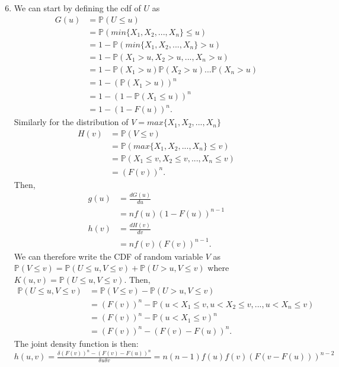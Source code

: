\documentclass{article}
\begin{document}
\begin{enumerate}
    \setcounter{enumi}{5}
    \item 
    
    We can start by defining the cdf of $U$ as
    \begin{align*}
        G(u)&=\mathbb{P}(U\leq u)\\
        &= \mathbb{P}(min\{X_1, X_2, ..., X_n\}\leq u)\\
        &= 1-\mathbb{P}(min\{X_1, X_2, ..., X_n\}> u)\\
        &= 1-\mathbb{P}(X_1>u, X_2>u, ..., X_n>u)\\
        &= 1-\mathbb{P}(X_1>u)\mathbb{P}(X_2>u)...\mathbb{P}(X_n>u)\\
        &=1-(\mathbb{P}(X_1>u))^n\\
        &=1-(1-\mathbb{P}(X_1\leq u))^n\\
        &= 1-(1-F(u))^n.
    \end{align*} Similarly for the distribution of $V=max\{X_1, X_2, ..., X_n\}$
    \begin{align*}
        H(v)&=\mathbb{P}(V\leq v)\\
        &= \mathbb{P}(max\{X_1, X_2, ..., X_n\}\leq v)\\
        &= \mathbb{P}(X_1\leq v, X_2\leq v, ..., X_n\leq v)\\
        &= (F(v))^n.
    \end{align*} Then, 
    \begin{align*}
        g(u)&=\frac{dG(u)}{du}\\
        &=nf(u)(1-F(u))^{n-1}\\
        h(v)&=\frac{dH(v)}{dv}\\
        &= nf(v)(F(v))^{n-1}.
    \end{align*} We can therefore write the CDF of random variable $V$ as $\mathbb{P}(V\leq v)=\mathbb{P}(U\leq u, V\leq v)+\mathbb{P}(U>u, V\leq v)$ where $K(u, v)=\mathbb{P}(U\leq u, V\leq v)$. Then,
    \begin{align*}
        \mathbb{P}(U\leq u, V\leq v) &= \mathbb{P}(V\leq v)-\mathbb{P}(U>u, V\leq v)\\
        &= (F(v))^n-\mathbb{P}(u<X_1\leq v, u<X_2\leq v, ..., u<X_n\leq v)\\
        &= (F(v))^n-\mathbb{P}(u<X_1\leq v)^n\\
        &= (F(v))^n-(F(v)-F(u))^n.
    \end{align*} The joint density function is then: $h(u, v)=\frac{\delta(F(v))^n-(F(v)-F(u))^n}{\delta u\delta v}=n(n-1)f(u)f(v)(F(v-F(u)))^{n-2}$
    

\end{enumerate}
\end{document}
